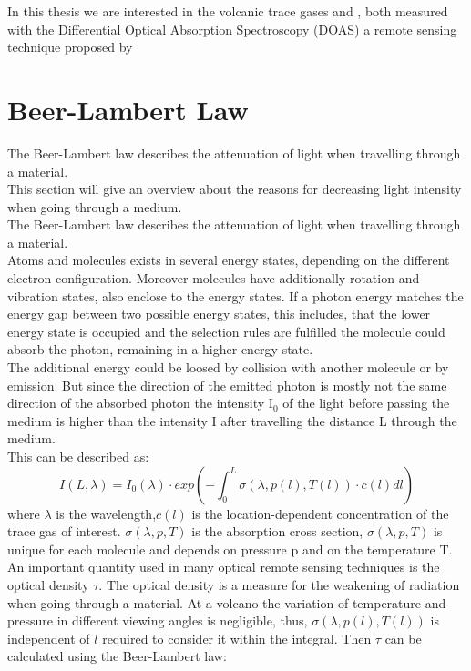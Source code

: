 \documentclass  [
  paper    = a4,
  BCOR     = 10mm,
  twoside,
  fontsize = 12pt,
  fleqn,
  toc      = bibnumbered,
  toc      = listofnumbered,
  numbers  = noendperiod,
  headings = normal,
  listof   = leveldown,
  version  = 3.03
]                                       {scrreprt}
\begin{document}
	In this thesis we are interested in the volcanic trace gases  and , both measured with the Differential Optical Absorption Spectroscopy (DOAS) a remote sensing technique proposed by \citet{platt1980observations}

	

	\section*{Beer-Lambert Law}
	The Beer-Lambert law describes the attenuation of light when travelling through a material.\\
	This section will give an overview about the reasons for decreasing light intensity when going through a medium.\\
	The Beer-Lambert law describes the attenuation of light when travelling through a material.\\
%
	Atoms and molecules exists in several energy states, depending on the different electron configuration. Moreover molecules have additionally rotation and vibration states, also enclose to the energy states. If a photon energy matches the energy gap between two possible energy states, this includes, that the lower energy state is occupied and the selection rules are fulfilled  the molecule could absorb the photon, remaining in a higher energy state.\\
	The additional energy could be loosed by collision with another molecule or by emission. But since the direction of the emitted photon is mostly not the same direction of the absorbed photon the intensity I$_{0}$ of the light before passing the medium is higher than the intensity I after travelling the distance L through the medium.\\
	This can be described as:\\ 
	\begin{equation}
	I\left(L,\lambda\right) = I_{0}\left(\lambda\right)\cdot exp\left(-\int^{L}_{0}\sigma\left(\lambda,p(l),T(l)\right)\cdot c\left(l\right)dl\right)
	\end{equation}
	where $\lambda$ is the wavelength,$c\left(l\right)$ is the location-dependent concentration of the trace gas of interest. $\sigma\left(\lambda,p,T\right)$ is the absorption cross section, $\sigma\left(\lambda,p,T\right)$ is unique for each molecule and depends on pressure p and on the temperature T.\\
	An important quantity used in many optical remote sensing techniques is the optical density $\tau$. The optical density is a measure for the weakening of radiation when going through a material. At a volcano the variation of temperature and pressure in different viewing angles is negligible, thus, $\sigma\left(\lambda,p(l),T(l)\right)$ is independent of $l$ required to consider it within the integral. Then  $\tau$ can be calculated using the Beer-Lambert law:
\end{document}
